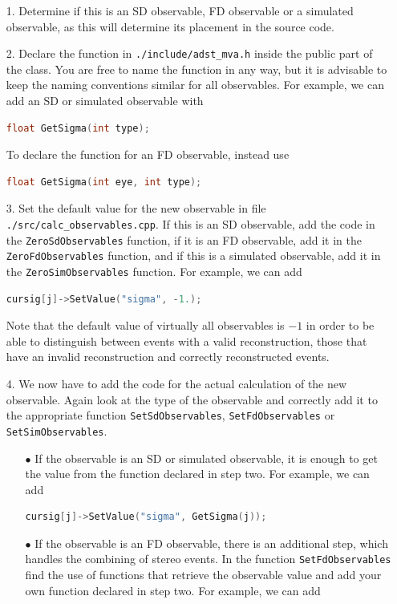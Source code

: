 \documentclass[12pt,a4paper]{report}
\begin{document}
\begin{itemize}
\item[1.] Determine if this is an SD observable, FD observable or a simulated observable, as this will determine its placement in the source code.
\item[2.] Declare the function in \texttt{./include/adst\_mva.h} inside the public part of the class. You are free to name the function in any way, but it is advisable to keep the naming conventions similar for all observables. For example, we can add an SD or simulated observable with
\begin{lstlisting}[language=C++]
  float GetSigma(int type);
\end{lstlisting}
To declare the function for an FD observable, instead use
\begin{lstlisting}[language=C++]
  float GetSigma(int eye, int type);
\end{lstlisting}
\item[3.] Set the default value for the new observable in file \texttt{./src/calc\_observables.cpp}. If this is an SD observable, add the code in the \texttt{ZeroSdObservables} function, if it is an FD observable, add it in the \texttt{ZeroFdObservables} function, and if this is a simulated observable, add it in the \texttt{ZeroSimObservables} function. For example, we can add
\begin{lstlisting}[language=C++]
  cursig[j]->SetValue("sigma", -1.);
\end{lstlisting}
Note that the default value of virtually all observables is $-1$ in order to be able to distinguish between events with a valid reconstruction, those that have an invalid reconstruction and correctly reconstructed events.
\item[4.] We now have to add the code for the actual calculation of the new observable. Again look at the type of the observable and correctly add it to the appropriate function \texttt{SetSdObservables}, \texttt{SetFdObservables} or \texttt{SetSimObservables}.
\begin{itemize}
\item[$\bullet$] If the observable is an SD or simulated observable, it is enough to get the value from the function declared in step two. For example, we can add
\begin{lstlisting}[language=C++]
  cursig[j]->SetValue("sigma", GetSigma(j));
\end{lstlisting}
\item[$\bullet$] If the observable is an FD observable, there is an additional step, which handles the combining of stereo events. In the function \texttt{SetFdObservables} find the use of functions that retrieve the observable value and add your own function declared in step two. For example, we can add

\end{itemize}
\end{itemize}
\end{document}
